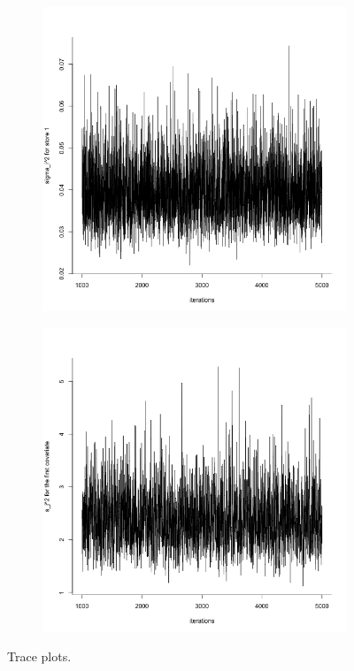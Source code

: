 \documentclass[11pt]{article}
\begin{document}
\begin{figure}
    \vspace{1cm}
    \centering
    \begin{subfigure}[t]{0.45\textwidth}
        \centering
        \includegraphics[width=\linewidth]{Ex5/figures/tra_sig2.png} 
    \end{subfigure}
    \hfill
    \begin{subfigure}[t]{0.45\textwidth}
        \centering
        \includegraphics[width=\linewidth]{Ex5/figures/tra_s2.png} 
    \end{subfigure}
    \caption{Trace plots.}
\end{figure}
\end{document}
